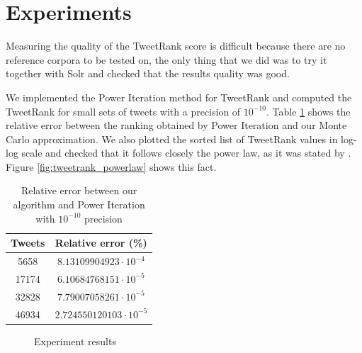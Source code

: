 \section{Experiments}
Measuring the quality of the TweetRank score is difficult because there are no reference corpora to be tested on, the only thing that we did was to try it together with Solr and checked that the results quality was good.

We implemented the Power Iteration method for TweetRank and computed the TweetRank for small sets of tweets with a precision of $10^{-10}$. Table \ref{table:mc_errors} shows the relative error between the ranking obtained by Power Iteration and our Monte Carlo approximation. We also plotted the sorted list of TweetRank values in log-log scale and checked that it follows closely the power law, as it was stated by \cite{Avrachenkov:2007:MCM:1272804.1272825}. Figure \ref{fig:tweetrank_powerlaw} shows this fact.

\begin{table}
\centering
\begin{tabular}{|c|c|}
\hline Tweets & Relative error (\%) \\
\hline 5658 & $8.13109904923 \cdot 10^{-4}$ \\
\hline 17174 & $6.10684768151 \cdot 10^{-5}$ \\
\hline 32828 & $7.79007058261 \cdot 10^{-5}$ \\
\hline 46934 & $2.724550120103 \cdot 10^{-5}$ \\
\hline
\end{tabular}
\caption{Relative error between our algorithm and Power Iteration with $10^{-10}$ precision}
\label{table:mc_errors}
\end{table}

\begin{figure}
\centering
{}
\qquad
{} 
\caption{Experiment results}
\end{figure}

